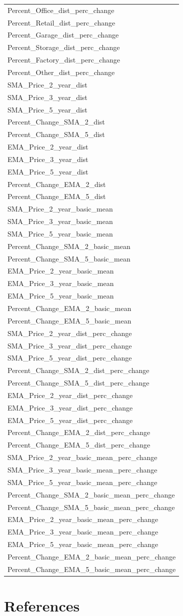 \documentclass[]{article}
\begin{document}
\begin{longtable}[]{@{}l@{}}
Percent\_Office\_dist\_perc\_change\tabularnewline
Percent\_Retail\_dist\_perc\_change\tabularnewline
Percent\_Garage\_dist\_perc\_change\tabularnewline
Percent\_Storage\_dist\_perc\_change\tabularnewline
Percent\_Factory\_dist\_perc\_change\tabularnewline
Percent\_Other\_dist\_perc\_change\tabularnewline
SMA\_Price\_2\_year\_dist\tabularnewline
SMA\_Price\_3\_year\_dist\tabularnewline
SMA\_Price\_5\_year\_dist\tabularnewline
Percent\_Change\_SMA\_2\_dist\tabularnewline
Percent\_Change\_SMA\_5\_dist\tabularnewline
EMA\_Price\_2\_year\_dist\tabularnewline
EMA\_Price\_3\_year\_dist\tabularnewline
EMA\_Price\_5\_year\_dist\tabularnewline
Percent\_Change\_EMA\_2\_dist\tabularnewline
Percent\_Change\_EMA\_5\_dist\tabularnewline
SMA\_Price\_2\_year\_basic\_mean\tabularnewline
SMA\_Price\_3\_year\_basic\_mean\tabularnewline
SMA\_Price\_5\_year\_basic\_mean\tabularnewline
Percent\_Change\_SMA\_2\_basic\_mean\tabularnewline
Percent\_Change\_SMA\_5\_basic\_mean\tabularnewline
EMA\_Price\_2\_year\_basic\_mean\tabularnewline
EMA\_Price\_3\_year\_basic\_mean\tabularnewline
EMA\_Price\_5\_year\_basic\_mean\tabularnewline
Percent\_Change\_EMA\_2\_basic\_mean\tabularnewline
Percent\_Change\_EMA\_5\_basic\_mean\tabularnewline
SMA\_Price\_2\_year\_dist\_perc\_change\tabularnewline
SMA\_Price\_3\_year\_dist\_perc\_change\tabularnewline
SMA\_Price\_5\_year\_dist\_perc\_change\tabularnewline
Percent\_Change\_SMA\_2\_dist\_perc\_change\tabularnewline
Percent\_Change\_SMA\_5\_dist\_perc\_change\tabularnewline
EMA\_Price\_2\_year\_dist\_perc\_change\tabularnewline
EMA\_Price\_3\_year\_dist\_perc\_change\tabularnewline
EMA\_Price\_5\_year\_dist\_perc\_change\tabularnewline
Percent\_Change\_EMA\_2\_dist\_perc\_change\tabularnewline
Percent\_Change\_EMA\_5\_dist\_perc\_change\tabularnewline
SMA\_Price\_2\_year\_basic\_mean\_perc\_change\tabularnewline
SMA\_Price\_3\_year\_basic\_mean\_perc\_change\tabularnewline
SMA\_Price\_5\_year\_basic\_mean\_perc\_change\tabularnewline
Percent\_Change\_SMA\_2\_basic\_mean\_perc\_change\tabularnewline
Percent\_Change\_SMA\_5\_basic\_mean\_perc\_change\tabularnewline
EMA\_Price\_2\_year\_basic\_mean\_perc\_change\tabularnewline
EMA\_Price\_3\_year\_basic\_mean\_perc\_change\tabularnewline
EMA\_Price\_5\_year\_basic\_mean\_perc\_change\tabularnewline
Percent\_Change\_EMA\_2\_basic\_mean\_perc\_change\tabularnewline
Percent\_Change\_EMA\_5\_basic\_mean\_perc\_change\tabularnewline
\bottomrule
\end{longtable}

\section*{References}\label{references}
\end{document}
